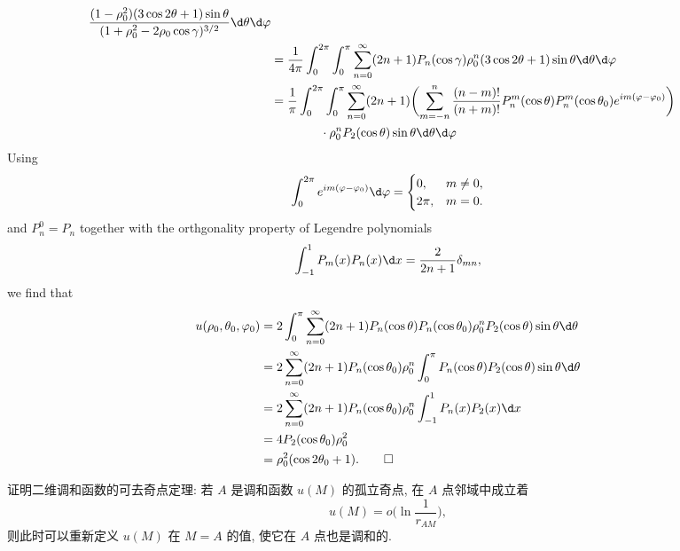 \begin{solution}
\begin{equation}
\begin{aligned}
          \frac{(1-\rho_0^2)(3\cos2\theta+1)\sin\theta}{(1+\rho_0^2-2\rho_0\cos\gamma)^{3/2}}
          \d\theta\d\varphi \\
      & = \frac{1}{4\pi} \int_0^{2\pi} \int_0^\pi
          \sum_{n=0}^\infty (2n+1) P_n(\cos\gamma)\rho_0^n (3\cos2\theta+1) \sin\theta
          \d\theta\d\varphi \\
      & = \frac{1}{\pi} \int_0^{2\pi} \int_0^\pi
          \sum_{n=0}^\infty (2n+1) \biggl(\sum_{m=-n}^n \frac{(n-m)!}{(n+m)!} P_n^m(\cos\theta)
          P_n^m(\cos\theta_0) e^{im(\varphi-\varphi_0)}\biggr) \\
      & \qquad\qquad \cdot\rho_0^n P_2(\cos\theta) \sin\theta \d\theta\d\varphi
    \end{aligned}
  \end{equation}
  Using
  \[ \int_0^{2\pi} e^{im(\varphi-\varphi_0)} \d\varphi
      = \begin{cases}
        0,    & m\neq 0, \\
        2\pi, & m=0.
      \end{cases}\]
  and $P_n^0=P_n$ together with the orthgonality property of Legendre polynomials
  \[ \int_{-1}^1 P_m(x)P_n(x) \d x = \frac{2}{2n+1}\delta_{mn}, \]
  we find that
  \begin{equation}\label{eq:3.8}
    \begin{aligned}
      u(\rho_0,\theta_0,\varphi_0)
      & = 2 \int_0^\pi \sum_{n=0}^\infty (2n+1) P_n(\cos\theta) P_n(\cos\theta_0)
          \rho_0^n P_2(\cos\theta) \sin\theta \d\theta \\
      & = 2 \sum_{n=0}^\infty (2n+1) P_n(\cos\theta_0) \rho_0^n
          \int_0^\pi P_n(\cos\theta) P_2(\cos\theta) \sin\theta \d\theta \\
      & = 2 \sum_{n=0}^\infty (2n+1) P_n(\cos\theta_0) \rho_0^n
          \int_{-1}^1 P_n(x) P_2(x) \d x \\
      & = 4 P_2(\cos\theta_0) \rho_0^2 \\
      & = \rho_0^2 (\cos2\theta_0+1). \qedhere
    \end{aligned}
  \end{equation}
\end{solution}


\begin{exercise}
  证明二维调和函数的可去奇点定理:
  若 $A$ 是调和函数 $u(M)$ 的孤立奇点, 在 $A$ 点邻域中成立着
  \begin{equation}
    u(M) = o\biggl(\ln\frac{1}{r_{AM}}\biggr), \tag{$\star$}
  \end{equation}
  则此时可以重新定义 $u(M)$ 在 $M=A$ 的值, 使它在 $A$ 点也是调和的.
\end{exercise}

